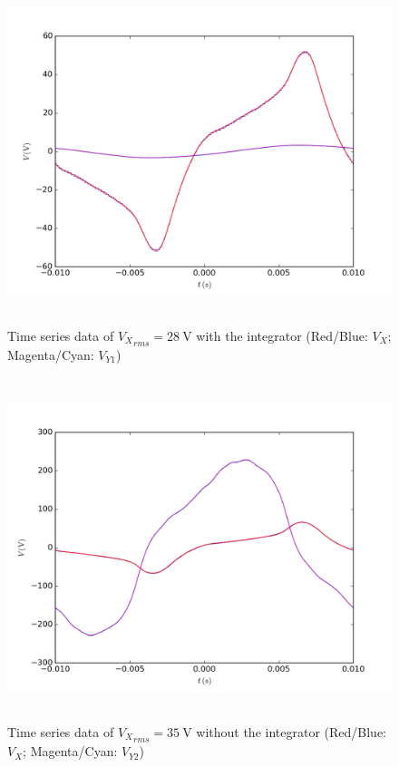 \documentclass[a4paper]{scrartcl}
\begin{document}
\begin{figure}
    \centering
    \includegraphics[height = 10cm]{with-integrator-waveform.png}
    \caption{Time series data of \({V_X}_{rms} = \SI{28}{\volt}\) with the integrator (Red/Blue: \(V_X\); Magenta/Cyan: \(V_{Y1}\))}
    \label{fig:with-integrator-waveform}
\end{figure}

\begin{figure}
    \centering
    \includegraphics[height = 10cm]{without-integrator-waveform.png}
        \caption{Time series data of \({V_X}_{rms} = \SI{35}{\volt}\) without the integrator (Red/Blue: \(V_X\); Magenta/Cyan: \(V_{Y2}\))}
    \label{fig:without-integrator-waveform}
\end{figure}
\end{document}
